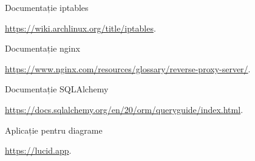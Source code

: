 \begin{thebibliography}{64}
	Documentație iptables
	
	\url{https://wiki.archlinux.org/title/iptables}.
	
	Documentație nginx
	
	\url{https://www.nginx.com/resources/glossary/reverse-proxy-server/}.
	
	Documentație SQLAlchemy
	
	\url{https://docs.sqlalchemy.org/en/20/orm/queryguide/index.html}.
	
	Aplicație pentru diagrame
	
	\url{https://lucid.app}.
	
\end{thebibliography}